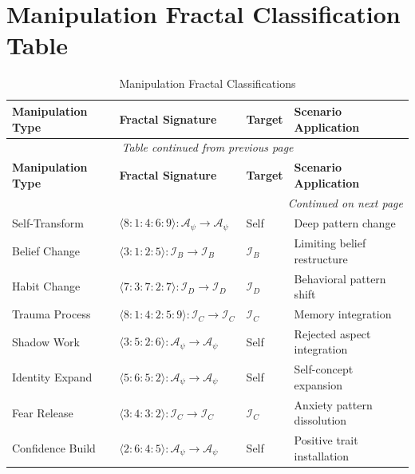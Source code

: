 \documentclass[11pt,twoside]{book}
\renewcommand{\arraystretch}{1.2}  %
\newcommand{\Ideas}{\mathcal{I}}
\newcommand{\PsychAttractor}{\mathcal{A}_\psi}
\newcommand{\IdeasB}{\Ideas_B}     %
\newcommand{\IdeasC}{\Ideas_C}     %
\newcommand{\IdeasD}{\Ideas_D}     %
\begin{document}
\section{Manipulation Fractal Classification Table}

\begin{center}
\small
\renewcommand{\arraystretch}{1.3}
\begin{longtable}{p{1.8cm}|p{2.2cm}|p{1.5cm}|p{4cm}}
\caption{Manipulation Fractal Classifications} \\
\toprule
\textbf{Manipulation Type} & \textbf{Fractal Signature} & \textbf{Target} & \textbf{Scenario Application} \\
\midrule
\endfirsthead
\multicolumn{4}{c}{\textit{Table continued from previous page}} \\
\toprule
\textbf{Manipulation Type} & \textbf{Fractal Signature} & \textbf{Target} & \textbf{Scenario Application} \\
\midrule
\endhead
\midrule
\multicolumn{4}{r}{\textit{Continued on next page}} \\
\endfoot
\bottomrule
\endlastfoot
Self-Transform & $\langle 8:1:4:6:9 \rangle : \PsychAttractor \to \PsychAttractor$ & Self & Deep pattern change \\
Belief Change & $\langle 3:1:2:5 \rangle : \IdeasB \to \IdeasB$ & $\IdeasB$ & Limiting belief restructure \\
Habit Change & $\langle 7:3:7:2:7 \rangle : \IdeasD \to \IdeasD$ & $\IdeasD$ & Behavioral pattern shift \\
Trauma Process & $\langle 8:1:4:2:5:9 \rangle : \IdeasC \to \IdeasC$ & $\IdeasC$ & Memory integration \\
Shadow Work & $\langle 3:5:2:6 \rangle : \PsychAttractor \to \PsychAttractor$ & Self & Rejected aspect integration \\
Identity Expand & $\langle 5:6:5:2 \rangle : \PsychAttractor \to \PsychAttractor$ & Self & Self-concept expansion \\
Fear Release & $\langle 3:4:3:2 \rangle : \IdeasC \to \IdeasC$ & $\IdeasC$ & Anxiety pattern dissolution \\
Confidence Build & $\langle 2:6:4:5 \rangle : \PsychAttractor \to \PsychAttractor$ & Self & Positive trait installation \\
\end{longtable}
\end{center}

\end{document}
